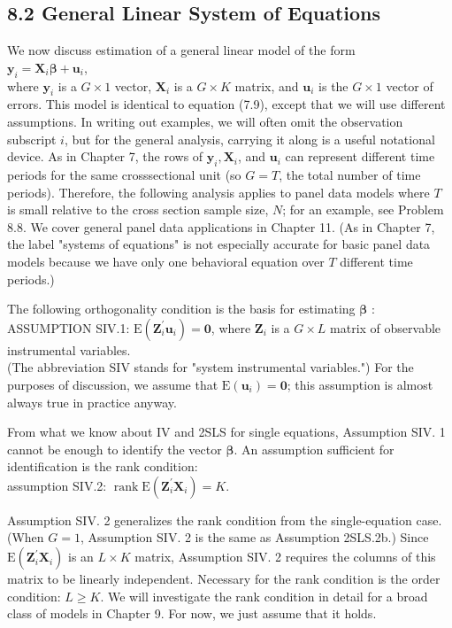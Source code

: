 \documentclass[10pt]{article}
\begin{document}
\subsection*{8.2 General Linear System of Equations}
We now discuss estimation of a general linear model of the form\\
$\mathbf{y}_{i}=\mathbf{X}_{i} \boldsymbol{\beta}+\mathbf{u}_{i}$,\\
where $\mathbf{y}_{i}$ is a $G \times 1$ vector, $\mathbf{X}_{i}$ is a $G \times K$ matrix, and $\mathbf{u}_{i}$ is the $G \times 1$ vector of errors. This model is identical to equation (7.9), except that we will use different assumptions. In writing out examples, we will often omit the observation subscript $i$, but for the general analysis, carrying it along is a useful notational device. As in Chapter 7, the rows of $\mathbf{y}_{i}, \mathbf{X}_{i}$, and $\mathbf{u}_{i}$ can represent different time periods for the same crosssectional unit (so $G=T$, the total number of time periods). Therefore, the following analysis applies to panel data models where $T$ is small relative to the cross section sample size, $N$; for an example, see Problem 8.8. We cover general panel data applications in Chapter 11. (As in Chapter 7, the label "systems of equations" is not especially accurate for basic panel data models because we have only one behavioral equation over $T$ different time periods.)

The following orthogonality condition is the basis for estimating $\boldsymbol{\beta}$ :\\
ASSUMPTION SIV.1: $\mathrm{E}\left(\mathbf{Z}_{i}^{\prime} \mathbf{u}_{i}\right)=\mathbf{0}$, where $\mathbf{Z}_{i}$ is a $G \times L$ matrix of observable instrumental variables.\\
(The abbreviation SIV stands for "system instrumental variables.") For the purposes of discussion, we assume that $\mathrm{E}\left(\mathbf{u}_{i}\right)=\mathbf{0}$; this assumption is almost always true in practice anyway.

From what we know about IV and 2SLS for single equations, Assumption SIV. 1 cannot be enough to identify the vector $\boldsymbol{\beta}$. An assumption sufficient for identification is the rank condition:\\
assumption SIV.2: $\operatorname{rank} \mathrm{E}\left(\mathbf{Z}_{i}^{\prime} \mathbf{X}_{i}\right)=K$.

Assumption SIV. 2 generalizes the rank condition from the single-equation case. (When $G=1$, Assumption SIV. 2 is the same as Assumption 2SLS.2b.) Since $\mathrm{E}\left(\mathbf{Z}_{i}^{\prime} \mathbf{X}_{i}\right)$ is an $L \times K$ matrix, Assumption SIV. 2 requires the columns of this matrix to be linearly independent. Necessary for the rank condition is the order condition: $L \geq K$. We will investigate the rank condition in detail for a broad class of models in Chapter 9. For now, we just assume that it holds.
\end{document}
